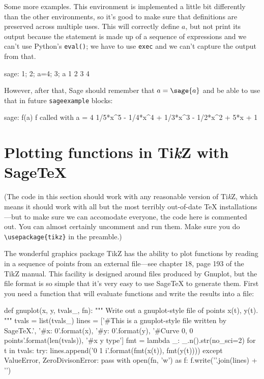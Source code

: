 \documentclass{article}
\begin{document}
Some more examples. This environment is implemented a little bit
differently than the other environments, so it's good to make sure that
definitions are preserved across multiple uses. This will correctly
define $a$, but not print its output because the statement is made up of
a sequence of expressions and we can't use Python's \texttt{eval()}; we
have to use \texttt{exec} and we can't capture the output from that.
\begin{sageexample}
  sage: 1; 2; a=4; 3; a
  1
  2
  3
  4
\end{sageexample}
However, after that, Sage should remember that $a = \sage{a}$ and be
able to use that in future \texttt{sageexample} blocks:
\begin{sageexample}
  sage: f(a)
  f called with a =  4
  1/5*x^5 - 1/4*x^4 + 1/3*x^3 - 1/2*x^2 + 5*x + 1
\end{sageexample}

\section{Plotting functions in Ti\emph{k}Z with Sage\TeX}

(The code in this section should work with any reasonable version of
Ti\emph{k}Z, which means it should work with all but the most terribly
out-of-date \TeX{} installations---but to make sure we can accomodate
everyone, the code here is commented out. You can almost certainly
uncomment and run them. Make sure you do \verb|\usepackage{tikz}| in the
preamble.)


The wonderful graphics package TikZ has the ability to plot functions by
reading in a sequence of points from an external file---see chapter 18,
page 193 of the TikZ manual. This facility is designed around files
produced by Gnuplot, but the file format is so simple that it's very
easy to use Sage\TeX{} to generate them. First you need a function that
will evaluate functions and write the results into a file:


\begin{sageblock}
  def gnuplot(x, y, tvals_, fn):
      """
      Write out a gnuplot-style file of points x(t), y(t).
      """
      tvals = list(tvals_)
      lines = ['#This is a gnuplot-style file written by SageTeX.',
               '#x: {0}'.format(x),
               '#y: {0}'.format(y),
               '#Curve 0, {0} points'.format(len(tvals)),
               '#x y type']
      fmt = lambda _: _.n().str(no_sci=2)
      for t in tvals:
          try:
              lines.append('{0} {1}  i'.format(fmt(x(t)), fmt(y(t))))
          except ValueError, ZeroDivisonError:
              pass
      with open(fn, 'w') as f:
          f.write('\n'.join(lines) + '\n')
\end{sageblock}
\end{document}
